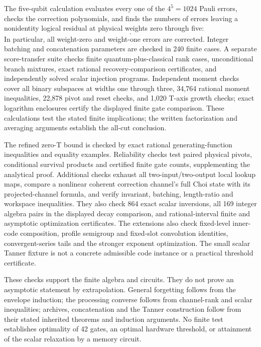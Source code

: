 \documentclass[11pt,a4paper]{article}
\numberwithin{equation}{section}
\theoremstyle{remark}\newtheorem*{remark}{Interpretation}
\begin{document}
The five-qubit calculation evaluates every one of the $4^5=1024$ Pauli errors, checks the correction polynomials, and finds the numbers of errors leaving a nonidentity logical residual at physical weights zero through five:
\begin{equation}
[0,\ 0,\ 90,\ 210,\ 270,\ 198].
\end{equation}
In particular, all weight-zero and weight-one errors are corrected. Integer batching and concatenation parameters are checked in 240 finite cases. A separate score-transfer suite checks finite quantum-plus-classical rank cases, unconditional branch mixtures, exact rational recovery-comparison certificates, and independently solved scalar injection programs. Independent moment checks cover all binary subspaces at widths one through three, 34,764 rational moment inequalities, 22,878 pivot and reset checks, and 1,020 T-axis growth checks; exact logarithm enclosures certify the displayed finite gate comparison. These calculations test the stated finite implications; the written factorization and averaging arguments establish the all-cut conclusion.

The refined zero-T bound is checked by exact rational generating-function inequalities and equality examples. Reliability checks test paired physical pivots, conditional survival products and certified finite gate counts, supplementing the analytical proof. Additional checks exhaust all two-input/two-output local lookup maps, compare a nonlinear coherent correction channel's full Choi state with its projected-channel formula, and verify invariant, batching, length-ratio and workspace inequalities. They also check 864 exact scalar inversions, all 169 integer algebra pairs in the displayed decay comparison, and rational-interval finite and asymptotic optimization certificates. The extensions also check fixed-level inner-code composition, profile semigroup and fixed-slot convolution identities, convergent-series tails and the stronger exponent optimization. The small scalar Tanner fixture is not a concrete admissible code instance or a practical threshold certificate.

These checks support the finite algebra and circuits. They do not prove an asymptotic statement by extrapolation. General forgetting follows from the envelope induction; the processing converse follows from channel-rank and scalar inequalities; archives, concatenation and the Tanner construction follow from their stated inherited theorems and induction arguments. No finite test establishes optimality of 42 gates, an optimal hardware threshold, or attainment of the scalar relaxation by a memory circuit.
\end{document}

